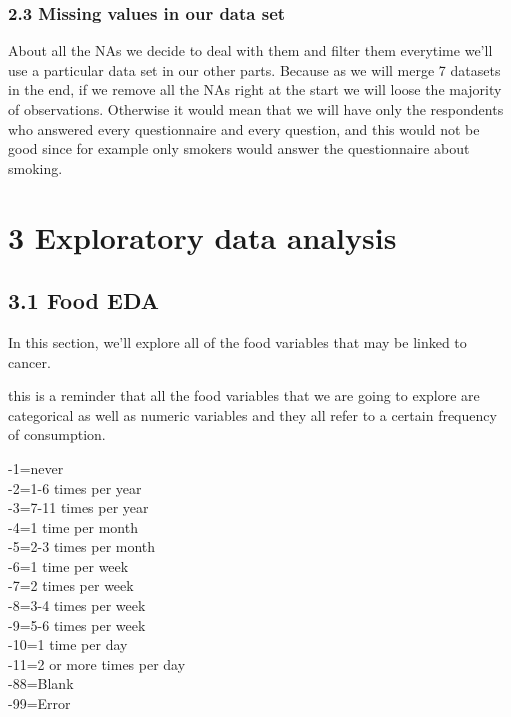 \documentclass[
]{article}
\begin{document}
\hypertarget{missing-values-in-our-data-set}{%
\subsubsection{2.3 Missing values in our data
set}\label{missing-values-in-our-data-set}}

About all the NAs we decide to deal with them and filter them everytime
we'll use a particular data set in our other parts. Because as we will
merge 7 datasets in the end, if we remove all the NAs right at the start
we will loose the majority of observations. Otherwise it would mean that
we will have only the respondents who answered every questionnaire and
every question, and this would not be good since for example only
smokers would answer the questionnaire about smoking.

\hypertarget{exploratory-data-analysis}{%
\section{\texorpdfstring{\textbf{3 Exploratory data
analysis}}{3 Exploratory data analysis}}\label{exploratory-data-analysis}}

\hypertarget{food-eda}{%
\subsection{3.1 Food EDA}\label{food-eda}}

In this section, we'll explore all of the food variables that may be
linked to cancer.

this is a reminder that all the food variables that we are going to
explore are categorical as well as numeric variables and they all refer
to a certain frequency of consumption.

-1=never\\
-2=1-6 times per year\\
-3=7-11 times per year\\
-4=1 time per month\\
-5=2-3 times per month\\
-6=1 time per week\\
-7=2 times per week\\
-8=3-4 times per week\\
-9=5-6 times per week\\
-10=1 time per day\\
-11=2 or more times per day\\
-88=Blank\\
-99=Error
\end{document}
